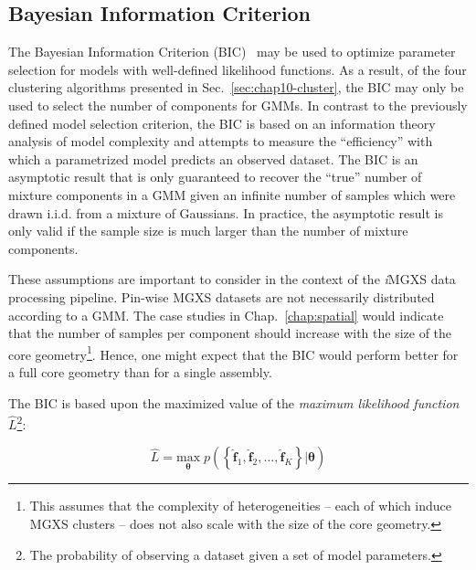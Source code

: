 \subsection{Bayesian Information Criterion}
\label{subsec:chap10-bic}

The Bayesian Information Criterion (BIC)~\cite{schwarz1978bic} may be used to optimize parameter selection for models with well-defined likelihood functions. As a result, of the four clustering algorithms presented in Sec.~\ref{sec:chap10-cluster}, the BIC may only be used to select the number of components for \acp{GMM}. In contrast to the previously defined model selection criterion, the BIC is based on an information theory analysis of model complexity and attempts to measure the ``efficiency'' with which a parametrized model predicts an observed dataset. The BIC is an asymptotic result that is only guaranteed to recover the ``true'' number of mixture components in a \ac{GMM} given an infinite number of samples which were drawn i.i.d. from a mixture of Gaussians. In practice, the asymptotic result is only valid if the sample size is much larger than the number of mixture components. 

These assumptions are important to consider in the context of the \textit{i}\ac{MGXS} data processing pipeline. Pin-wise \ac{MGXS} datasets are not necessarily distributed according to a \ac{GMM}. The case studies in Chap.~\ref{chap:spatial} would indicate that the number of samples per component should increase with the size of the core geometry\footnote{This assumes that the complexity of heterogeneities -- each of which induce \ac{MGXS} clusters -- does not also scale with the size of the core geometry.}. Hence, one might expect that the BIC would perform better for a full core geometry than for a single assembly.


The BIC is based upon the maximized value of the \textit{maximum likelihood function} $\hat{L}$\footnote{The probability of observing a dataset given a set of model parameters.}:

\begin{equation}
\label{eqn:chap10-likelihood}
\hat{L} = \underset{\boldsymbol{\theta}}{\textrm{max}} \; p \left( \left\{ \boldsymbol{\hat{f}}_{1}, \boldsymbol{\hat{f}}_{2}, \dots, \boldsymbol{\hat{f}}_{K} \right\} | \boldsymbol{\theta}\right)
\end{equation}

